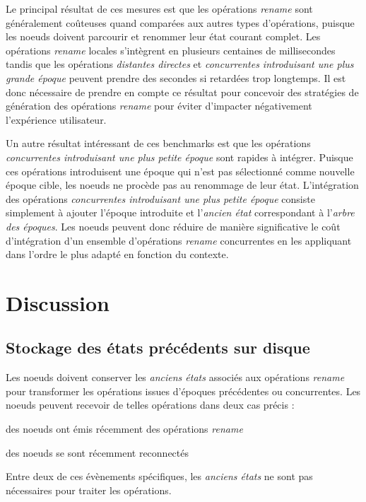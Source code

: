 \documentclass[12pt]{thesul}
\begin{document}
Le principal résultat de ces mesures est que les opérations \emph{rename} sont généralement coûteuses quand comparées aux autres types d'opérations, puisque les noeuds doivent parcourir et renommer leur état courant complet.
Les opérations \emph{rename} locales s'intègrent en plusieurs centaines de millisecondes tandis que les opérations \emph{distantes directes} et \emph{concurrentes introduisant une plus grande époque} peuvent prendre des secondes si retardées trop longtemps.
Il est donc nécessaire de prendre en compte ce résultat pour concevoir des stratégies de génération des opérations \emph{rename} pour éviter d'impacter négativement l'expérience utilisateur.

Un autre résultat intéressant de ces benchmarks est que les opérations \emph{concurrentes introduisant une plus petite époque} sont rapides à intégrer.
Puisque ces opérations introduisent une époque qui n'est pas sélectionné comme nouvelle époque cible, les noeuds ne procède pas au renommage de leur état.
L'intégration des opérations \emph{concurrentes introduisant une plus petite époque} consiste simplement à ajouter l'époque introduite et l'\emph{ancien état} correspondant à l'\emph{arbre des époques}.
Les noeuds peuvent donc réduire de manière significative le coût d'intégration d'un ensemble d'opérations \emph{rename} concurrentes en les appliquant dans l'ordre le plus adapté en fonction du contexte.

\section{Discussion}

\subsection{Stockage des états précédents sur disque}

\label{sec:offloading-former-states}

Les noeuds doivent conserver les \emph{anciens états} associés aux opérations \emph{rename} pour transformer les opérations issues d'époques précédentes ou concurrentes.
Les noeuds peuvent recevoir de telles opérations dans deux cas précis :
\begin{enumerate*}[label=(\roman*)]
  \item des noeuds ont émis récemment des opérations \emph{rename}
  \item des noeuds se sont récemment reconnectés
\end{enumerate*}
Entre deux de ces évènements spécifiques, les \emph{anciens états} ne sont pas nécessaires pour traiter les opérations.
\end{document}
